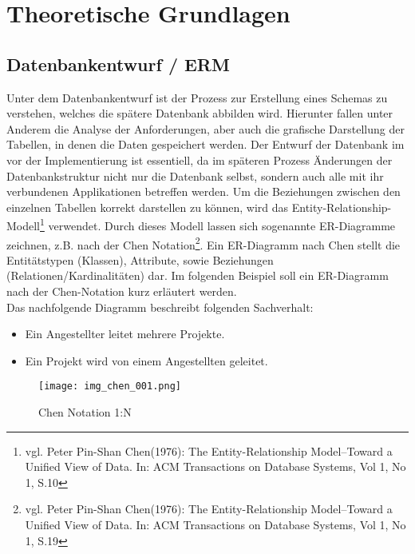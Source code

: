\chapter{Theoretische Grundlagen}
\label{cha:theogrund}

\section{Datenbankentwurf / ERM}
\label{sec:erm}

Unter dem Datenbankentwurf ist der Prozess zur Erstellung eines Schemas zu verstehen, welches die spätere Datenbank abbilden wird.
Hierunter fallen unter Anderem die Analyse der Anforderungen, aber auch die grafische Darstellung der Tabellen, in denen die Daten gespeichert werden.
Der Entwurf der Datenbank im vor der Implementierung ist essentiell, da im späteren Prozess Änderungen der Datenbankstruktur nicht nur die Datenbank selbst, sondern auch alle mit ihr verbundenen Applikationen betreffen werden.
Um die Beziehungen zwischen den einzelnen Tabellen korrekt darstellen zu können, wird das Entity-Relationship-Modell\footnote{vgl. Peter Pin-Shan Chen(1976): The Entity-Relationship Model--Toward a Unified View of Data. In: ACM Transactions on Database Systems, Vol 1, No 1, S.10} verwendet.
Durch dieses Modell lassen sich sogenannte ER-Diagramme zeichnen, z.B. nach der Chen Notation\footnote{vgl. Peter Pin-Shan Chen(1976): The Entity-Relationship Model--Toward a Unified View of Data. In: ACM Transactions on Database Systems, Vol 1, No 1, S.19}.
Ein ER-Diagramm nach Chen stellt die Entitätstypen (Klassen), Attribute, sowie Beziehungen (Relationen/Kardinalitäten) dar.
Im folgenden Beispiel soll ein ER-Diagramm nach der Chen-Notation kurz erläutert werden.\\

Das nachfolgende Diagramm beschreibt folgenden Sachverhalt:

\begin{itemize}
\item Ein Angestellter leitet mehrere Projekte.
\item Ein Projekt wird von einem Angestellten geleitet.
\end{itemize}

\begin{figure}[H]
\begin{center}
\texttt{[image: img\_chen\_001.png]}
\caption{Chen Notation 1:N}
\label{chenpic1}
\end{center}
\end{figure}


